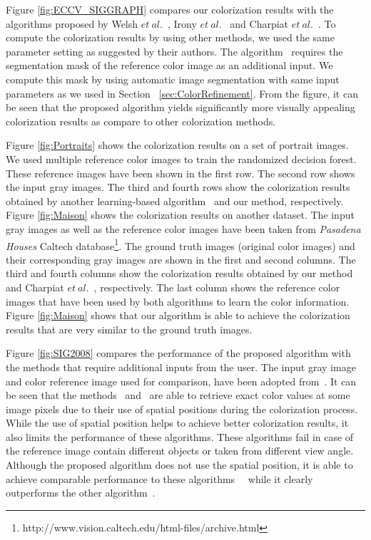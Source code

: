 \documentclass[twocolumn]{svjour3}          %
\begin{document}
Figure \ref{fig:ECCV_SIGGRAPH} compares our colorization results with the algorithms proposed by Welsh $et\ al.$~\cite{Welsh02}, Irony $et\ al.$~\cite{Irony05} and Charpiat $et\ al.$~\cite{Charpiat08}. To compute the colorization results by using other methods, we used the same parameter setting as suggested by their authors. The algorithm~\cite{Irony05} requires the segmentation mask of the reference color image as an additional input. We compute this mask by using automatic image segmentation with same input parameters as we used in Section ~\ref{sec:ColorRefinement}. From the figure, it can be seen that the proposed algorithm yields significantly more visually appealing colorization results as compare to other colorization methods.

Figure \ref{fig:Portraits} shows the colorization results on a set of portrait images. We used multiple reference color images to train the randomized decision forest. These reference images have been shown in the first row. The second row shows the input gray images. The third and fourth rows show the colorization results obtained by another learning-based algorithm~\cite{Charpiat08} and our method, respectively. Figure \ref{fig:Maison} shows the colorization results on another dataset. The input gray images as well as the reference color images have been taken from \emph{Pasadena Houses} Caltech database\footnote{http://www.vision.caltech.edu/html-files/archive.html}. The ground truth images (original color images) and their corresponding gray images are shown in the first and second columns. The third and fourth columns show the colorization results obtained by our method and Charpiat $et\ al.$~\cite{Charpiat08}, respectively. The last column shows the reference color images that have been used by both algorithms to learn the color information. Figure \ref{fig:Maison} shows that our algorithm is able to achieve the colorization results that are very similar to the ground truth images.

Figure \ref{fig:SIG2008} compares the performance of the proposed algorithm with the methods that require additional inputs from the user. The input gray image and color reference image used for comparison, have been adopted from~\cite{Liu08}. It can be seen that the methods~\cite{Liu08} and~\cite{Alex11} are able to retrieve exact color values at some image pixels due to their use of spatial positions during the colorization process. While the use of spatial position helps to achieve better colorization results, it also limits the performance of these algorithms. These algorithms fail in case of the reference image contain different objects or taken from different view angle. Although the proposed algorithm does not use the spatial position, it is able to achieve comparable performance to these algorithms~\cite{Liu08}~\cite{Alex11} while it clearly outperforms the other algorithm~\cite{Irony05}.  
\end{document}
